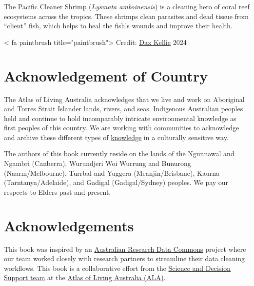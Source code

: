 \documentclass[
  letterpaper,
  DIV=11,
  numbers=noendperiod]{scrreprt}
\begin{document}
The
\href{https://bie.ala.org.au/species/https://biodiversity.org.au/afd/taxa/55ed63d8-7382-4611-8016-08553e0fe20d}{Pacific
Cleaner Shrimp (\emph{Lysmata amboinensis})} is a cleaning hero of coral
reef ecosystems across the tropics. These shrimps clean parasites and
dead tissue from ``client'' fish, which helps to heal the fish's wounds
and improve their health.

{{< fa paintbrush title="paintbrush">}} Credit:
\href{https://labs.ala.org.au/about/Kellie_Dax/}{Dax Kellie} 2024

\section*{Acknowledgement of Country}\label{acknowledgement-of-country}


The Atlas of Living Australia acknowledges that we live and work on
Aboriginal and Torres Strait Islander lands, rivers, and seas.
Indigenous Australian peoples held and continue to hold incomparably
intricate environmental knowledge as first peoples of this country. We
are working with communities to acknowledge and archive these different
types of
\href{https://www.ala.org.au/indigenous-ecological-knowledge/}{knowledge}
in a culturally sensitive way.

The authors of this book currently reside on the lands of the Ngunnawal
and Ngambri (Canberra), Wurundjeri Woi Wurrung and Bunurong
(Naarm/Melbourne), Turrbal and Yuggera (Meanjin/Brisbane), Kaurna
(Tarntanya/Adelaide), and Gadigal (Gadigal/Sydney) peoples. We pay our
respects to Elders past and present.

\section*{Acknowledgements}\label{acknowledgements}


This book was inspired by an \href{https://ardc.edu.au/}{Australian
Research Data Commons} project where our team worked closely with
research partners to streamline their data cleaning workflows. This book
is a collaborative effort from the
\href{https://labs.ala.org.au/about/}{Science and Decision Support team}
at the \href{https://www.ala.org.au/}{Atlas of Living Australia (ALA)}.
\end{document}
